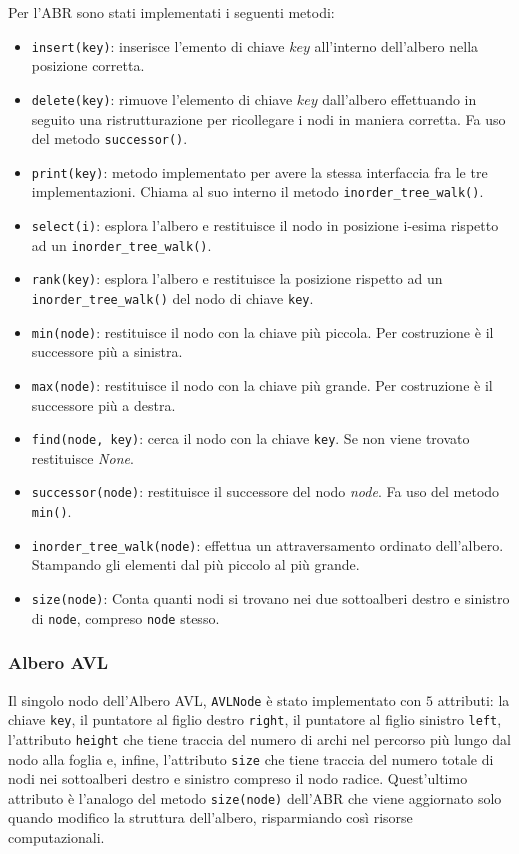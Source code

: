 Per l'ABR sono stati implementati i seguenti metodi:
\begin{itemize}
	\item \texttt{insert(key)}: inserisce l'emento di chiave $key$ all'interno dell'albero nella posizione corretta.
	\item \texttt{delete(key)}: rimuove l'elemento di chiave $key$ dall'albero effettuando in seguito una ristrutturazione per ricollegare i nodi in maniera corretta. Fa uso del metodo \texttt{successor()}.
	\item \texttt{print(key)}: metodo implementato per avere la stessa interfaccia fra le tre implementazioni. Chiama al suo interno il metodo \texttt{inorder\_tree\_walk()}.
	\item \sloppy \texttt{select(i)}: esplora l'albero e restituisce il nodo in posizione i-esima rispetto ad un \texttt{inorder\_tree\_walk()}.
	\item \texttt{rank(key)}: esplora l'albero e restituisce la posizione rispetto ad un \texttt{inorder\_tree\_walk()} del nodo di chiave \texttt{key}.
	\item \texttt{min(node)}: restituisce il nodo con la chiave più piccola. Per costruzione è il successore più a sinistra.
	\item \texttt{max(node)}: restituisce il nodo con la chiave più grande. Per costruzione è il successore più a destra.
	\item \texttt{find(node, key)}: cerca il nodo con la chiave \texttt{key}. Se non viene trovato restituisce \textit{None}.
	\item \texttt{successor(node)}: restituisce il successore del nodo \textit{node}. Fa uso del metodo \texttt{min()}.
	\item \texttt{inorder\_tree\_walk(node)}: effettua un attraversamento ordinato dell'albero. Stampando gli elementi dal più piccolo al più grande.
	\item \texttt{size(node)}: Conta quanti nodi si trovano nei due sottoalberi destro e sinistro di \texttt{node}, compreso \texttt{node} stesso.
\end{itemize}

\subsubsection*{Albero AVL}
Il singolo nodo dell'Albero AVL, \texttt{AVLNode} è stato implementato con $5$ attributi: la chiave \texttt{key}, il puntatore al figlio destro \texttt{right}, il puntatore al figlio sinistro \texttt{left}, l'attributo \texttt{height} che tiene traccia del numero di archi nel percorso più lungo dal nodo alla foglia e, infine, l'attributo \texttt{size} che tiene traccia del numero totale di nodi nei sottoalberi destro e sinistro compreso il nodo radice. Quest'ultimo attributo è l'analogo del metodo \texttt{size(node)} dell'ABR che viene aggiornato solo quando modifico la struttura dell'albero, risparmiando così risorse computazionali.


